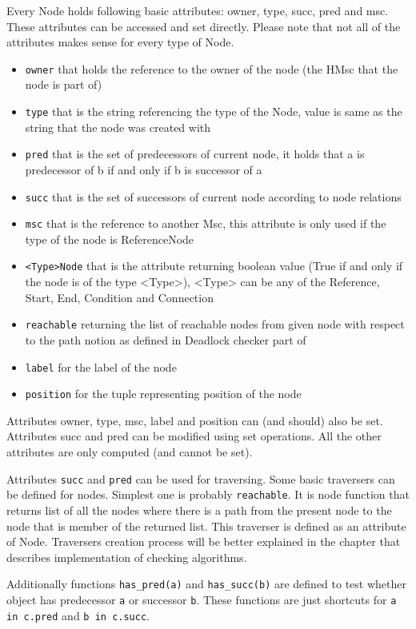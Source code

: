 \documentclass[11pt,oneside]{fithesis2}
\newcommand{\T}[1]{\texttt{#1}}
\newcommand{\ite}[1]{\item{\texttt{#1}}}
\begin{document}
Every Node holds following basic attributes: owner, type, succ, pred and msc. These attributes can be accessed and set directly. Please note that not all of the attributes makes sense for every type of Node.
\begin{itemize}
\item{\texttt{owner}} that holds the reference to the owner of the node (the HMsc that the node is part of)
\item{\texttt{type}} that is the string referencing the type of the Node, value is same as the string that the node was created with
\item{\texttt{pred}} that is the set of predecessors of current node, it holds that a is predecessor of b if and only if b is successor of a
\item{\texttt{succ}} that is the set of successors of current node according to node relations
\item{\texttt{msc}} that is the reference to another Msc, this attribute is only used if the type of the node is ReferenceNode
\ite{<Type>Node} that is the attribute returning boolean value (True if and only if the node is of the type <Type>), <Type> can be any of the Reference, Start, End, Condition and Connection
\ite{reachable} returning the list of reachable nodes from given node with respect to the path notion as defined in Deadlock checker part of \cite{babica}
\ite{label} for the label of the node
\ite{position} for the tuple representing position of the node
\end{itemize}

Attributes owner, type, msc, label and position can (and should) also be set. Attributes succ and pred can be modified using set operations. All the other attributes are only computed (and cannot be set).

Attributes \T{succ} and \T{pred} can be used for traversing. Some basic traversers can be defined for nodes. Simplest one is probably \T{reachable}. It is node function that returns list of all the nodes where there is a path from the present node to the node that is member of the returned list. This traverser is defined as an attribute of Node. Traversers creation process will be better explained in the chapter that describes implementation of checking algorithms.

Additionally functions \T{has\_pred(a)} and \T{has\_succ(b)} are defined to test whether object has predecessor \T{a} or successor \T{b}. These functions are just shortcuts for \T{a in c.pred} and \T{b in c.succ}.
\end{document}
